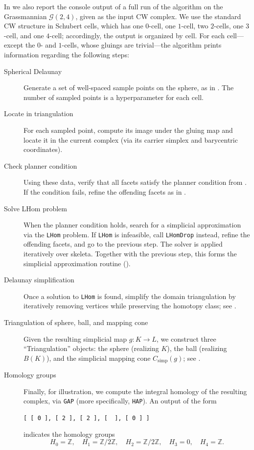 \documentclass[a4paper,english,cleveref,autoref,thm-restate,nolineno]{socg-lipics-v2021}
\newcommand{\Z}{\mathbb Z}
\newcommand{\conesimp}[1] { C_\mathrm{simp}(#1) } %
\newcommand{\GG}{\mathcal G} %
\begin{document}
In  we also report the console output of a full run of the algorithm on the Grassmannian $\GG(2,4)$, given as the input CW complex. 
We use the standard CW structure in Schubert cells, which has one $0$-cell, one $1$-cell, two $2$-cells, one $3$-cell, and one $4$-cell; accordingly, the output is organized by cell.
For each cell---except the $0$- and $1$-cells, whose gluings are trivial---the algorithm prints information regarding the following steps:

\begin{description}
	\item[Spherical Delaunay]
	Generate a set of well-spaced sample points on the sphere, as in .
	The number of sampled points is a hyperparameter for each cell.
	
	\item[Locate in triangulation]
	For each sampled point, compute its image under the gluing map and locate it in the current complex (via its carrier simplex and barycentric coordinates).
	
	\item[Check planner condition]
	Using these data, verify that all facets satisfy the planner condition from . 
	If the condition fails, refine the offending facets as in .
	
	\item[Solve LHom problem]
	When the planner condition holds, search for a simplicial approximation via the \texttt{LHom} problem. 
	If \texttt{LHom} is infeasible, call \texttt{LHomDrop} instead, refine the offending facets, and go to the previous step. 
	The solver is applied iteratively over skeleta. 
	Together with the previous step, this forms the simplicial approximation routine ().
	
	\item[Delaunay simplification]
	Once a solution to \texttt{LHom} is found, simplify the domain triangulation by iteratively removing vertices while preserving the homotopy class; see .
	
	\item[Triangulation of sphere, ball, and mapping cone]
	Given the resulting simplicial map $g\colon K\to L$, we construct three ``Triangulation'' objects: the sphere (realizing $K$), the ball (realizing $B(K)$), and the simplicial mapping cone $\conesimp{g}$; see .
	
	\item[Homology groups]
	Finally, for illustration, we compute the integral homology of the resulting complex, via \texttt{GAP} (more specifically, \texttt{HAP}). 
	An output of the form 
	\begin{center}
		\verb|[ [ 0 ], [ 2 ], [ 2 ], [  ], [ 0 ] ]|
	\end{center}
	indicates the homology groups
	\[
	H_0=\Z,\quad
	H_1=\Z/2\Z,\quad
	H_2=\Z/2\Z,\quad
	H_3=0,\quad
	H_4=\Z.
	\]
\end{description} 
\end{document}
